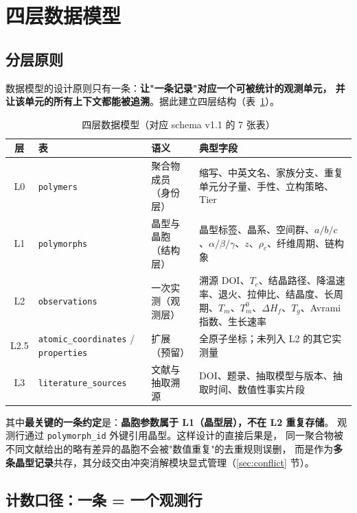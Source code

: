 \documentclass[11pt,a4paper]{ctexart}
\begin{document}
\section{四层数据模型}\label{sec:model}

\subsection{分层原则}

数据模型的设计原则只有一条：\textbf{让"一条记录"对应一个可被统计的观测单元，
并让该单元的所有上下文都能被追溯}。据此建立四层结构（表~\ref{tab:layers}）。

\begin{table}[htbp]
\centering
\caption{四层数据模型（对应 schema v1.1 的 7 张表）}
\label{tab:layers}
\begin{tabularx}{\textwidth}{c l l X}
\toprule
层 & 表 & 语义 & 典型字段\\
\midrule
L0 & \texttt{polymers} & 聚合物成员（身份层） & 缩写、中英文名、家族分支、重复单元分子量、手性、立构策略、Tier\\
L1 & \texttt{polymorphs} & 晶型与晶胞（结构层） & 晶型标签、晶系、空间群、$a/b/c$、$\alpha/\beta/\gamma$、$z$、$\rho_c$、纤维周期、链构象\\
L2 & \texttt{observations} & 一次实测（观测层） & 溯源 DOI、$T_c$、结晶路径、降温速率、退火、拉伸比、结晶度、长周期、$T_m$、$T_m^0$、$\Delta H_f$、$T_g$、Avrami 指数、生长速率\\
L2.5 & \texttt{atomic\_coordinates} / \texttt{properties} & 扩展（预留） & 全原子坐标；未列入 L2 的其它实测量\\
L3 & \texttt{literature\_sources} & 文献与抽取溯源 & DOI、题录、抽取模型与版本、抽取时间、数值性事实片段\\
\bottomrule
\end{tabularx}
\end{table}

其中\textbf{最关键的一条约定}是：\textbf{晶胞参数属于 L1（晶型层），不在 L2 重复存储}。
观测行通过 \texttt{polymorph\_id} 外键引用晶型。这样设计的直接后果是，
同一聚合物被不同文献给出的略有差异的晶胞不会被"数值重复"的去重规则误删，
而是作为\textbf{多条晶型记录}共存，其分歧交由冲突消解模块显式管理（\ref{sec:conflict} 节）。

\subsection{计数口径：一条 = 一个观测行}
\end{document}
